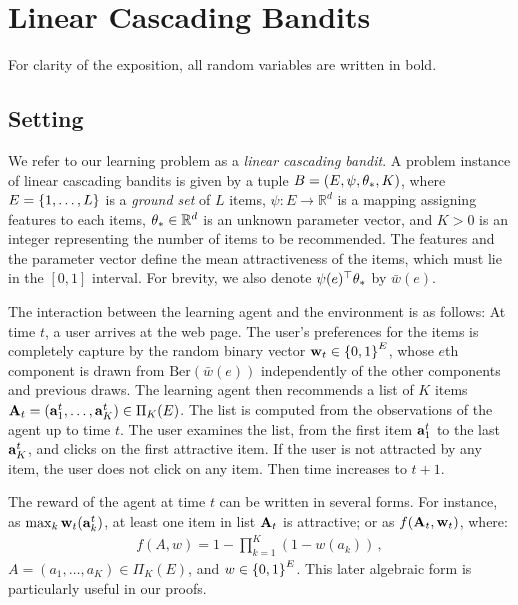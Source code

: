 
\section{Linear Cascading Bandits}
\label{sec:cascading bandits}

For clarity of the exposition, all random variables are written in bold.


\subsection{Setting}
\label{sec:setting}

We refer to our learning problem as a \emph{linear cascading bandit}.
A problem instance of linear cascading bandits is given
by a tuple $B = (E, \psi, \theta_*, K)$,
where $E = \left\{1, \dots, L\right\}$ is a \emph{ground set} of $L$ items,
$\psi : E \rightarrow \mathbb{R}^d$ is a mapping assigning features to each items,
$\theta_* \in \mathbb{R}^d$ is an unknown parameter vector,
and $K > 0$ is an integer representing the number of items to be recommended.
The features and the parameter vector define the mean attractiveness of the items, which must lie in the $[0,1]$ interval.
For brevity, we also denote $\psi(e)^\top\theta_*$ by $\bar{w}(e)$.

The interaction between the learning agent and the environment is as follows:
At time $t$, a user arrives at the web page. The user's preferences for the
items is completely capture by the random binary vector $\mathbf{w}_t\in \left\{0,1\right\}^E$, whose $e$th component is drawn from $\mathrm{Ber}( \bar{w}(e))$ independently of the other components and previous draws.
The learning agent then recommends a list of $K$ items
$\mathbf{A}_t = (\mathbf{a}^t_1, \dots, \mathbf{a}^t_K) \in \Pi_K(E)$.
The list is computed from the observations of the agent up to time $t$.
The user examines the list,
  from the first item $\mathbf{a}^t_1$ to the last $\mathbf{a}^t_K$,
  and clicks on the first attractive item.
If the user is not attracted by any item,
  the user does not click on any item. Then time increases to $t + 1$.

The reward of the agent at time $t$ can be written in several forms.
For instance, as $\max_k \mathbf{w}_t(\mathbf{a}^t_k)$, at least one item in list $\mathbf{A}_t$ is attractive; or as $f(\mathbf{A}_t, \mathbf{w}_t)$, where:
\begin{align*}
  f(A, w) = 1 - \prod_{k = 1}^K (1 - w(a_k))\,,
\end{align*}
$A = (a_1, \dots, a_K) \in \Pi_K(E)$, and $w \in \left\{0, 1\right\}^E$. This later algebraic form is particularly useful in our proofs.

